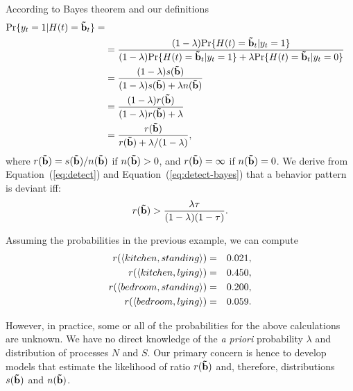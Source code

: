 According to Bayes theorem and our definitions
\begin{equation}
\begin{aligned}
\text{Pr}\{y_t=1|H(t)=\mathbf{\tilde{b}}_t\} = \\
& = \frac{(1-\lambda)\text{Pr}\{H(t)=\mathbf{\tilde{b}}_t|y_t=1\}}{(1-\lambda)\text{Pr}\{H(t)=\mathbf{\tilde{b}}_t|y_t=1\} + \lambda \text{Pr}\{H(t)=\mathbf{\tilde{b}}_t|y_t=0\}}\\
& = \frac{(1-\lambda)s(\mathbf{\tilde{b}})}{(1-\lambda)s(\mathbf{\tilde{b}}) + \lambda n(\mathbf{\tilde{b}})}\\
& = \frac{(1-\lambda)r(\mathbf{\tilde{b}})}{(1-\lambda)r(\mathbf{\tilde{b}}) + \lambda}\\
& = \frac{r(\mathbf{\tilde{b}})}{r(\mathbf{\tilde{b}}) + \lambda/(1-\lambda)},
\end{aligned}
\label{eq:detect-bayes}
\end{equation}
\noindent
where $r(\mathbf{\tilde{b}})=s(\mathbf{\tilde{b}})/n(\mathbf{\tilde{b}})$ if $n(\mathbf{\tilde{b}}) > 0$, and $r(\mathbf{\tilde{b}})=\infty$ if $n(\mathbf{\tilde{b}})=0$. We derive from Equation~(\ref{eq:detect}) and Equation~(\ref{eq:detect-bayes}) that a behavior pattern is deviant iff:
\begin{equation}
		r(\mathbf{\tilde{b}}) > \frac{\lambda \tau}{(1-\lambda)(1-\tau)}.
\label{eq:detect-condition}
\end{equation}

Assuming the probabilities in the previous example, we can compute
\begin{eqnarray*}
r(\langle kitchen, standing \rangle) 	&=& 0.021, \\
r(\langle kitchen, lying \rangle) 		&=& 0.450, \\
r(\langle bedroom, standing \rangle) 	&=& 0.200, \\
r(\langle bedroom, lying \rangle)		&=& 0.059.
\end{eqnarray*}

However, in practice, some or all of the probabilities for the above calculations are unknown. We have no direct knowledge of the \emph{a priori} probability $\lambda$ and distribution of processes $N$ and $S$. Our primary concern is hence to develop models that estimate the likelihood of ratio $r(\mathbf{\tilde{b}})$ and, therefore, distributions $s(\mathbf{\tilde{b}})$ and $n(\mathbf{\tilde{b}})$. 




